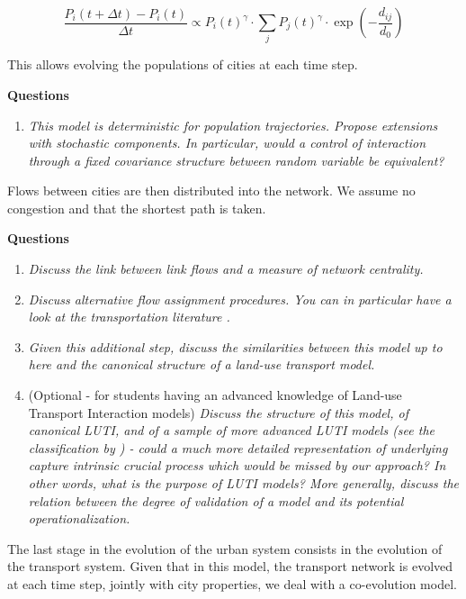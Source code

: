 \documentclass[11pt]{article}
\begin{document}
\[
\frac{P_i (t+ \Delta t) - P_i(t)}{\Delta t} \propto P_i(t)^{\gamma} \cdot \sum_j P_j(t)^{\gamma} \cdot \exp\left(- \frac{d_{ij}}{d_0}\right)
\]

This allows evolving the populations of cities at each time step.

\textbf{Questions}

\begin{enumerate}
	\item \textit{This model is deterministic for population trajectories. Propose extensions with stochastic components. In particular, would a control of interaction through a fixed covariance structure between random variable be equivalent?}
\end{enumerate}




Flows between cities are then distributed into the network. We assume no congestion and that the shortest path is taken.

\textbf{Questions}

\begin{enumerate}
	\item \textit{Discuss the link between link flows and a measure of network centrality.}
	\item \textit{Discuss alternative flow assignment procedures. You can in particular have a look at the transportation literature \cite{}.}
	\item \textit{Given this additional step, discuss the similarities between this model up to here and the canonical structure of a land-use transport model.}
	\item (Optional - for students having an advanced knowledge of Land-use Transport Interaction models) \textit{Discuss the structure of this model, of canonical LUTI, and of a sample of more advanced LUTI models (see the classification by \cite{}%
	) - could a much more detailed representation of underlying capture intrinsic crucial process which would be missed by our approach? In other words, what is the purpose of LUTI models? More generally, discuss the relation between the degree of validation of a model and its potential operationalization.
	}
\end{enumerate}




The last stage in the evolution of the urban system consists in the evolution of the transport system. Given that in this model, the transport network is evolved at each time step, jointly with city properties, we deal with a co-evolution model.
\end{document}
